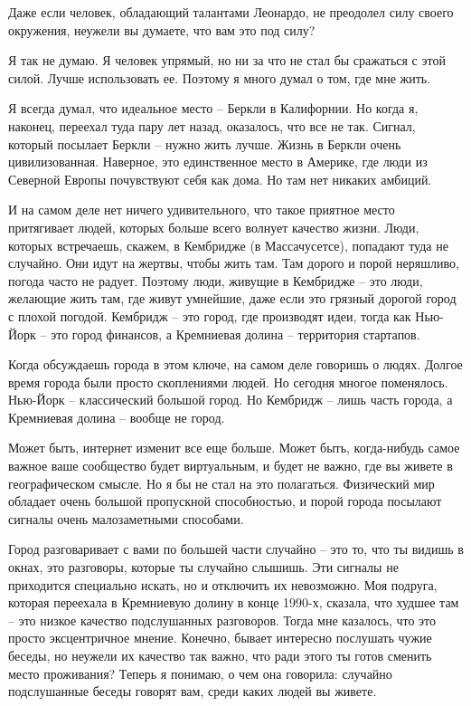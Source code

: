 \documentclass[ebook,12pt,oneside,openany]{memoir}
\begin{document}
Даже если человек, обладающий талантами Леонардо, не преодолел силу
своего окружения, неужели вы думаете, что вам это под силу? \newline

Я так не думаю. Я человек упрямый, но ни за что не стал бы сражаться с
этой силой. Лучше использовать ее. Поэтому я много думал о том, где
мне жить. \newline

Я всегда думал, что идеальное место – Беркли в Калифорнии. Но когда я,
наконец, переехал туда пару лет назад, оказалось, что все не так.
Сигнал, который посылает Беркли – нужно жить лучше. Жизнь в Беркли
очень цивилизованная. Наверное, это единственное место в Америке, где
люди из Северной Европы почувствуют себя как дома. Но там нет никаких
амбиций. \newline

И на самом деле нет ничего удивительного, что такое приятное место
притягивает людей, которых больше всего волнует качество жизни. Люди,
которых встречаешь, скажем, в Кембридже (в Массачусетсе), попадают
туда не случайно. Они идут на жертвы, чтобы жить там. Там дорого и
порой неряшливо, погода часто не радует. Поэтому люди, живущие в
Кембридже – это люди, желающие жить там, где живут умнейшие, даже если
это грязный дорогой город с плохой погодой. Кембридж – это город, где
производят идеи, тогда как Нью-Йорк – это город финансов, а Кремниевая
долина – территория стартапов. \newline

Когда обсуждаешь города в этом ключе, на самом деле говоришь о людях.
Долгое время города были просто скоплениями людей. Но сегодня многое
поменялось. Нью-Йорк – классический большой город. Но Кембридж – лишь
часть города, а Кремниевая долина – вообще не город. \newline

Может быть, интернет изменит все еще больше. Может быть, когда-нибудь
самое важное ваше сообщество будет виртуальным, и будет не важно, где
вы живете в географическом смысле. Но я бы не стал на это полагаться.
Физический мир обладает очень большой пропускной способностью, и порой
города посылают сигналы очень малозаметными способами. \newline

Город разговаривает с вами по большей части случайно – это то, что ты
видишь в окнах, это разговоры, которые ты случайно слышишь. Эти
сигналы не приходится специально искать, но и отключить их невозможно.
Моя подруга, которая переехала в Кремниевую долину в конце 1990-х,
сказала, что худшее там – это низкое качество подслушанных разговоров.
Тогда мне казалось, что это просто эксцентричное мнение. Конечно,
бывает интересно послушать чужие беседы, но неужели их качество так
важно, что ради этого ты готов сменить место проживания? Теперь я
понимаю, о чем она говорила: случайно подслушанные беседы говорят вам,
среди каких людей вы живете. \newline
\end{document}
